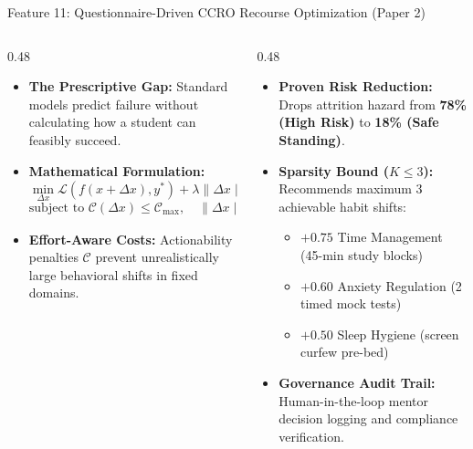\documentclass[aspectratio=169,10pt]{beamer}
\newcommand{\howbox}[2]{
  \begin{tcolorbox}[colframe=howframe,colbacktitle=howframe,colback=howbg,title=\textbf{HOW? The Technology \& Algorithms (#1)}]
  \scriptsize #2
  \end{tcolorbox}
}
\newcommand{\outbox}[2]{
  \begin{tcolorbox}[colframe=outframe,colbacktitle=outframe,colback=outbg,title=\textbf{OUTCOMES? Measurable Impact \& Results (#1)}]
  \scriptsize #2
  \end{tcolorbox}
}
\begin{document}
\begin{frame}{Feature 11: Questionnaire-Driven CCRO Recourse Optimization (Paper 2)}
\begin{columns}[T]
\begin{column}{0.48\textwidth}
\howbox{PGD-AFT Optimization Formulation}{
\begin{itemize}
    \item \textbf{The Prescriptive Gap:} Standard models predict failure without calculating how a student can feasibly succeed.
    \item \textbf{Mathematical Formulation:}
    $$\min_{\Delta x} \mathcal{L}(f(x+\Delta x), y^*) + \lambda \|\Delta x\|_2^2 + \gamma \|\Delta x\|_0$$
    $$\text{subject to } \mathcal{C}(\Delta x) \le \mathcal{C}_{\max}, \quad \|\Delta x\|_0 \le K_{\max} = 3$$
    \item \textbf{Effort-Aware Costs:} Actionability penalties $\mathcal{C}$ prevent unrealistically large behavioral shifts in fixed domains.
\end{itemize}
}
\end{column}

\begin{column}{0.48\textwidth}
\outbox{Empirical Clinical Results}{
\begin{itemize}
    \item \textbf{Proven Risk Reduction:} Drops attrition hazard from \textbf{78\% (High Risk)} to \textbf{18\% (Safe Standing)}.
    \item \textbf{Sparsity Bound ($K \le 3$):} Recommends maximum 3 achievable habit shifts:
    \begin{itemize}
        \item $+0.75$ Time Management (45-min study blocks)
        \item $+0.60$ Anxiety Regulation (2 timed mock tests)
        \item $+0.50$ Sleep Hygiene (screen curfew pre-bed)
    \end{itemize}
    \item \textbf{Governance Audit Trail:} Human-in-the-loop mentor decision logging and compliance verification.
\end{itemize}
}
\end{column}
\end{columns}
\end{frame}
\end{document}

